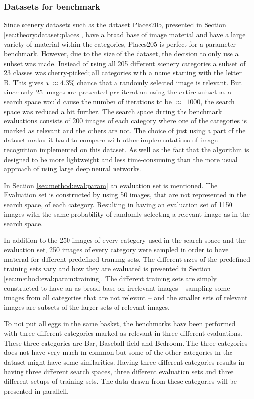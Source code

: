 \subsubsection{Datasets for benchmark}
\label{sec:meth:eval:bench:dataset}

Since scenery datasets such as the dataset Places205, presented in Section \ref{sec:theory:dataset:places}, have a broad base of image material and have a large variety of material within the categories, Places205 is perfect for a parameter benchmark. However, due to the size of the dataset, the decision to only use a subset was made. Instead of using all 205 different scenery categories a subset of 23 classes was cherry-picked; all categories with a name starting with the letter B. This gives a $\approx 4.3\%$ chance that a randomly selected image is relevant. But since only 25 images are presented per iteration using the entire subset as a search space would cause the number of iterations to be $\approx 11000$, the search space was reduced a bit further. The search space during the benchmark evaluations consists of 200 images of each category where one of the categories is marked as relevant and the others are not. 
The choice of just using a part of the dataset makes it hard to compare with other implementations of image recognition implemented on this dataset. As well as the fact that the algorithm is designed to be more lightweight and less time-consuming than the more usual approach of using large deep neural networks.

In Section \ref{sec:method:eval:param} an evaluation set is mentioned. The Evaluation set is constructed by using 50 images, that are not represented in the search space, of each category. Resulting in having an evaluation set of 1150 images with the same probability of randomly selecting a relevant image as in the search space.  

In addition to the 250 images of every category used in the search space and the evaluation set, 250 images of every category were sampled in order to have material for different predefined training sets. The different sizes of the predefined training sets vary and how they are evaluated is presented in Section \ref{sec:method:eval:param:training}. The different training sets are simply constructed to have an as broad base on irrelevant images -- sampling some images from all categories that are not relevant -- and the smaller sets of relevant images are subsets of the larger sets of relevant images.  

To not put all eggs in the same basket, the benchmarks have been performed with three different categories marked as relevant in three different evaluations. These three categories are Bar, Baseball field and Bedroom. The three categories does not have very much in common but some of the other categories in the dataset might have some similarities. Having three different categories results in having three different search spaces, three different evaluation sets and three different setups of training sets. The data drawn from these categories will be presented in parallell. 

